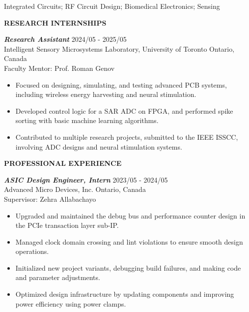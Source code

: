 \documentclass[11pt]{article}
\begin{document}
\vspace{0.1in}
\noindent
Integrated Circuits; RF Circuit Design; Biomedical Electronics; Sensing   \\

\vspace{0.15in}


{\noindent \bfseries RESEARCH INTERNSHIPS}
\vspace{0.05in}
\hline

\vspace{0.1in}

\noindent
{\sl \bfseries Research Assistant} \hfill 2024/05 - 2025/05 \\
\noindent Intelligent Sensory Microsystems Laboratory, University of Toronto \hfill Ontario, Canada \\
Faculty Mentor: Prof. Roman Genov

\begin{itemize} \itemsep -2pt
	\item Focused on designing, simulating, and testing advanced PCB systems, including wireless energy harvesting and neural stimulation.
	\item Developed control logic for a SAR ADC on FPGA, and performed spike sorting with basic machine learning algorithms.
    \item Contributed to multiple research projects, submitted to the IEEE ISSCC, involving ADC designs and neural stimulation systems.
\end{itemize}

\vspace{0.15in}


{\noindent \bfseries PROFESSIONAL EXPERIENCE}
\vspace{0.05in}
\hline

\vspace{0.1in}

\noindent
{\sl \bfseries ASIC Design Engineer, Intern} \hfill 2023/05 - 2024/05 \\
\noindent Advanced Micro Devices, Inc. \hfill Ontario, Canada \\
\noindent Supervisor: Zehra Allabachayo

\begin{itemize} \itemsep -2pt
	\item Upgraded and maintained the debug bus and performance counter design in the PCIe transaction layer sub-IP.
	\item Managed clock domain crossing and lint violations to ensure smooth design operations.
    \item Initialized new project variants, debugging build failures, and making code and parameter adjustments.
    \item Optimized design infrastructure by updating components and improving power efficiency using power clamps.
\end{itemize}
\end{document}
